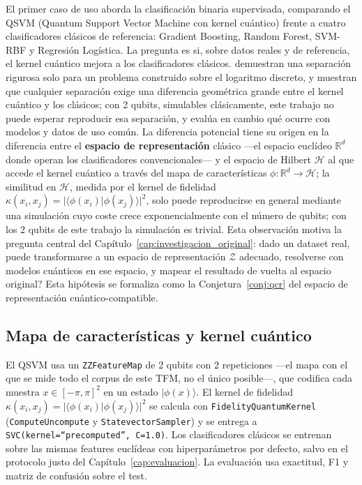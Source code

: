 El primer caso de uso aborda la clasificación binaria supervisada, comparando el QSVM (Quantum Support Vector Machine con kernel cuántico) frente a cuatro clasificadores clásicos de referencia: Gradient Boosting, Random Forest, SVM-RBF y Regresión Logística. La pregunta es si, sobre datos reales y de referencia, el kernel cuántico mejora a los clasificadores clásicos. \cite{liu2021} demuestran una separación rigurosa solo para un problema construido sobre el logaritmo discreto, y \cite{huang2021} muestran que cualquier separación exige una diferencia geométrica grande entre el kernel cuántico y los clásicos; con 2 qubits, simulables clásicamente, este trabajo no puede esperar reproducir esa separación, y evalúa en cambio qué ocurre con modelos y datos de uso común. La diferencia potencial tiene su origen en la diferencia entre el \textbf{espacio de representación} clásico ---el espacio euclídeo $\mathbb{R}^d$ donde operan los clasificadores convencionales--- y el espacio de Hilbert $\mathcal{H}$ al que accede el kernel cuántico a través del mapa de características $\phi\colon \mathbb{R}^d \rightarrow \mathcal{H}$; la similitud en $\mathcal{H}$, medida por el kernel de fidelidad $\kappa(x_i, x_j)=|\langle\phi(x_i)|\phi(x_j)\rangle|^2$, solo puede reproducirse en general mediante una simulación cuyo coste crece exponencialmente con el número de qubits; con los 2 qubits de este trabajo la simulación es trivial. Esta observación motiva la pregunta central del Capítulo~\ref{cap:investigacion_original}: dado un dataset real, \textquestiondown{}puede transformarse a un espacio de representación $\mathcal{Z}$ adecuado, resolverse con modelos cuánticos en ese espacio, y mapear el resultado de vuelta al espacio original? Esta hipótesis se formaliza como la Conjetura~\ref{conj:qcr} del espacio de representación cuántico-compatible.

\subsection{Mapa de características y kernel cuántico}

El QSVM usa un \texttt{ZZFeatureMap} de 2 qubits con 2 repeticiones ---el mapa con el que se mide todo el corpus de este TFM, no el único posible---, que codifica cada muestra $x\in[-\pi,\pi]^2$ en un estado $|\phi(x)\rangle$. El kernel de fidelidad $\kappa(x_i, x_j) = |\langle\phi(x_i)|\phi(x_j)\rangle|^2$ se calcula con \texttt{FidelityQuantumKernel} (\texttt{ComputeUncompute} y \texttt{StatevectorSampler}) y se entrega a \texttt{SVC(kernel=``precomputed'', C=1.0)}. Los clasificadores clásicos se entrenan sobre las mismas features euclídeas con hiperparámetros por defecto, salvo en el protocolo justo del Capítulo~\ref{cap:evaluacion}. La evaluación usa exactitud, F1 y matriz de confusión sobre el test.

